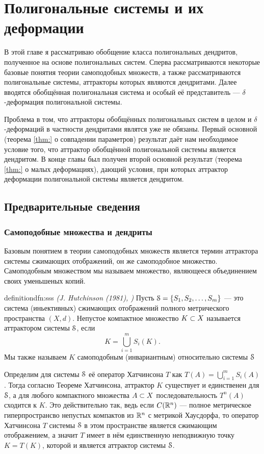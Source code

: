 \chapter{Полигональные системы и их деформации}

В этой главе я рассматриваю обобщение класса полигональных дендритов, полученное на основе полигональных систем.
Сперва рассматриваются некоторые базовые понятия теории самоподобных множеств, а также рассматриваются полигональные системы, аттракторы которых являются дендритами.
Далее вводятся обобщённая полигональная система и особый её представитель --- $\delta$-деформация полигональной системы.

Проблема в том, что аттракторы обобщённых полигональных систем в целом и $\delta$-деформаций в частности дендритами являтся уже не обязаны.
Первый основной (теорема \ref{thm:} о совпадении параметров) результат даёт нам необходимое условие того, что аттрактор обобщённой полигональной системы является дендритом.
В конце главы был получен второй основной результат (теорема \ref{thm:} о малых деформациях), дающий условия, при которых аттрактор деформации полигональной системы является дендритом.


\section{Предварительные сведения}


\subsection{Самоподобные множества и дендриты}

Базовым понятием в теории самоподобных множеств является термин аттрактора системы сжимающих отображений, он же самоподобное множество.
Самоподобным множеством мы называем множество, являющееся объединением своих уменьшеных копий.

\begin{restatethis}{definition}{dfn:sss} %
{\em (J. Hutchinson (1981), \cite{Hut1981})} 
Пусть ${\EuScript S}=\{S_1, S_2, \ldots, S_m\}$ --- это система (иньективных) сжимающих отображений полного метрического пространства $(X, d)$.
Непустое компактное множество $K\subset X$ называется аттрактором системы ${\EuScript S}$, если 
$$K = \bigcup \limits_{i=1}^m S_i (K).$$
Мы также называем $K$ самоподобным (инвариантным) относительно системы ${\EuScript S}$
\end{restatethis} 

Определим для системы ${\EuScript S}$ её оператор Хатчинсона $T$ как $T(A) = \bigcup \limits_{i = 1}^m S_i (A)$.
Тогда согласно Теореме Хатчинсона, аттрактор $K$ существует и единственен для ${\EuScript S}$, а для любого компактного множества $A\subset X$ последовательность $T^n (A)$ сходится к $K$.
Это действительно так, ведь если $C(\mathbb{R}^n)$ --- полное метрическое гиперпространсво непустых компактов из $\mathbb{R}^n$ с метрикой Хаусдорфа, то оператор Хатчинсона $T$ системы ${\EuScript S}$ в этом пространстве является сжимающим отображением, а значит $T$ имеет в нём единственную неподвижную точку $K=T(K)$, которой и является аттрактор системы ${\EuScript S}$.\\

